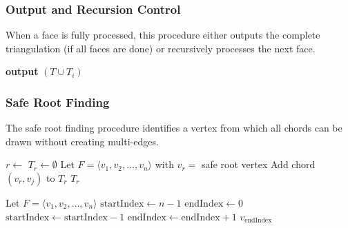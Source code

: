 \documentclass[12pt,a4paper]{article}
\theoremstyle{definition}
\theoremstyle{remark}
\begin{document}
\subsubsection{Output and Recursion Control}

When a face is fully processed, this procedure either outputs the complete triangulation (if all faces are done) or recursively processes the next face.

\begin{algorithm}
\caption{Output Triangulation or Continue to Next Face}
\label{alg:output}
\begin{algorithmic}[1]
     
        \State \textbf{output} $(T \cup T_i)$
    \Else
        \State {}
    \EndIf
\EndProcedure
\end{algorithmic}
\end{algorithm}


\subsubsection{Safe Root Finding}

The safe root finding procedure identifies a vertex from which all chords can be drawn without creating multi-edges.

\begin{algorithm}
\caption{Construct Root Triangulation}
\label{alg:safe_root_complete}
\begin{algorithmic}[1]
    \State $r \gets$ 
    \State $T_r \gets \emptyset$
    \State Let $F = \langle v_1, v_2, \ldots, v_n \rangle$ with $v_r = $ safe root vertex
            \State Add chord $(v_r, v_j)$ to $T_r$
        \EndIf
    \EndFor
    \State \Return $T_r$
\EndProcedure

    \State Let $F = \langle v_1, v_2, \ldots, v_n \rangle$
    \State $\text{startIndex} \gets n - 1$
    \State $\text{endIndex} \gets 0$
            \State $\text{startIndex} \gets \text{startIndex} - 1$
        \Else
            \State $\text{endIndex} \gets \text{endIndex} + 1$
        \EndIf
    \EndWhile
    \State \Return $v_{\text{endIndex}}$ 

\EndProcedure
\end{algorithmic}
\end{algorithm}
\end{document}
